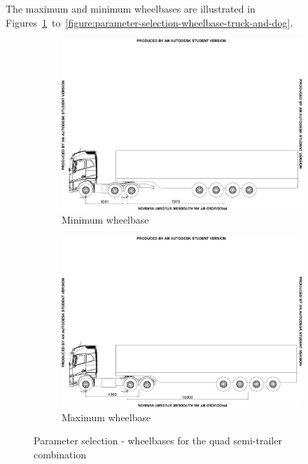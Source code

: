 The maximum and minimum wheelbases are illustrated in Figures~\ref{figure:parameter-selection-wheelbase-quad-semi-trailer}~to~\ref{figure:parameter-selection-wheelbase-truck-and-dog}.

\begin{figure}[!htbp]
	\centering
	\begin{subfigure}[t]{1\textwidth}
		\centering
		\includegraphics[width=1\textwidth]{fig/parameter-selection_wheelbase_min_quad-semi-trailer}
		\caption{Minimum wheelbase}
	\end{subfigure}%

	\begin{subfigure}[t]{1\textwidth}
		\centering
		\includegraphics[width=1\textwidth]{fig/parameter-selection_wheelbase_max_quad-semi-trailer}
		\caption{Maximum wheelbase}
	\end{subfigure}

	\caption{Parameter selection - wheelbases for the quad semi-trailer combination}
	\label{figure:parameter-selection-wheelbase-quad-semi-trailer}
\end{figure}

